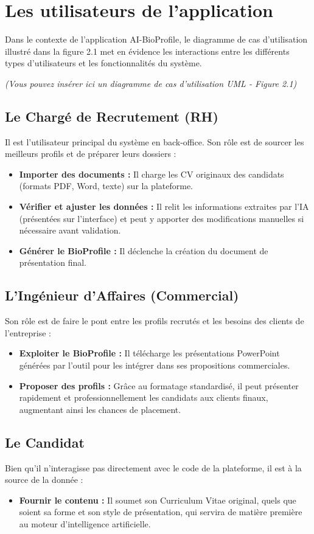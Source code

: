 \section{Les utilisateurs de l'application}

Dans le contexte de l'application AI-BioProfile, le diagramme de cas d'utilisation illustré dans la figure 2.1  met en évidence les interactions entre les différents types d'utilisateurs et les fonctionnalités du système.

\textit{(Vous pouvez insérer ici un diagramme de cas d'utilisation UML - Figure 2.1)}

\subsection{Le Chargé de Recrutement (RH)}
Il est l'utilisateur principal du système en back-office. Son rôle est de sourcer les meilleurs profils et de préparer leurs dossiers :
\begin{itemize}
    \item \textbf{Importer des documents :} Il charge les CV originaux des candidats (formats PDF, Word, texte) sur la plateforme.
    \item \textbf{Vérifier et ajuster les données :} Il relit les informations extraites par l'IA (présentées sur l'interface) et peut y apporter des modifications manuelles si nécessaire avant validation.
    \item \textbf{Générer le BioProfile :} Il déclenche la création du document de présentation final.
\end{itemize}

\subsection{L'Ingénieur d'Affaires (Commercial)}
Son rôle est de faire le pont entre les profils recrutés et les besoins des clients de l'entreprise :
\begin{itemize}
    \item \textbf{Exploiter le BioProfile :} Il télécharge les présentations PowerPoint générées par l'outil pour les intégrer dans ses propositions commerciales.
    \item \textbf{Proposer des profils :} Grâce au formatage standardisé, il peut présenter rapidement et professionnellement les candidats aux clients finaux, augmentant ainsi les chances de placement.
\end{itemize}

\subsection{Le Candidat}
Bien qu'il n'interagisse pas directement avec le code de la plateforme, il est à la source de la donnée :
\begin{itemize}
    \item \textbf{Fournir le contenu :} Il soumet son Curriculum Vitae original, quels que soient sa forme et son style de présentation, qui servira de matière première au moteur d'intelligence artificielle.
\end{itemize}

